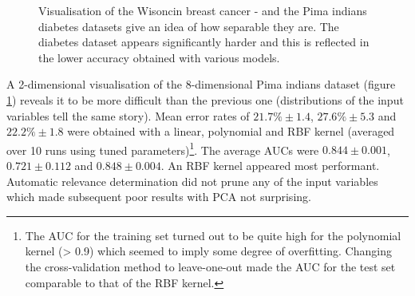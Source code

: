 \begin{figure}[htp]
\centering
{}\hfil
{}\hfil
{}\hfil
{}\hfil
\caption{Visualisation of the Wisoncin breast cancer - and the Pima indians diabetes datasets give an idea of how separable they are. The diabetes dataset appears significantly harder and this is reflected in the lower accuracy obtained with various models.}
\label{homeviz}
\end{figure}


A 2-dimensional visualisation of the 8-dimensional Pima indians dataset (figure \ref{homeviz}) reveals it to be more difficult than the previous one (distributions of the input variables tell the same story). Mean error rates of $21.7\%\pm 1.4$, $27.6\%\pm 5.3$ and $22.2\%\pm 1.8$ were obtained with a linear, polynomial and RBF kernel (averaged over 10 runs using tuned parameters)\footnote{The AUC for the training set turned out to be quite high for the polynomial kernel (> 0.9) which seemed to imply some degree of overfitting. Changing the cross-validation method to leave-one-out made the AUC for the test set comparable to that of the RBF kernel.}. The average AUCs were $0.844\pm 0.001$, $0.721\pm 0.112$ and $0.848\pm 0.004$. An RBF kernel appeared most performant. Automatic relevance determination did not prune any of the input variables which made subsequent poor results with PCA not surprising.

